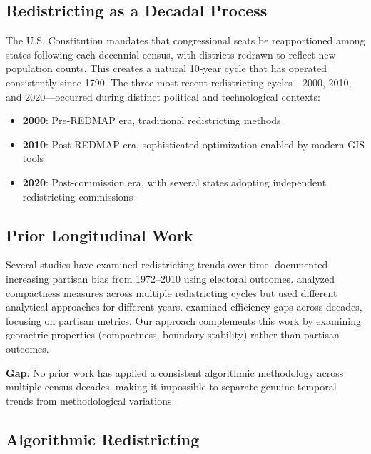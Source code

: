 
\subsection{Redistricting as a Decadal Process}

The U.S. Constitution mandates that congressional seats be reapportioned among states following each decennial census, with districts redrawn to reflect new population counts. This creates a natural 10-year cycle that has operated consistently since 1790. The three most recent redistricting cycles—2000, 2010, and 2020—occurred during distinct political and technological contexts:

\begin{itemize}
    \item \textbf{2000}: Pre-REDMAP era, traditional redistricting methods
    \item \textbf{2010}: Post-REDMAP era, sophisticated optimization enabled by modern GIS tools
    \item \textbf{2020}: Post-commission era, with several states adopting independent redistricting commissions
\end{itemize}

\subsection{Prior Longitudinal Work}

Several studies have examined redistricting trends over time. \citet{altman2011gerrymandering} documented increasing partisan bias from 1972--2010 using electoral outcomes. \citet{henderson2018measuring} analyzed compactness measures across multiple redistricting cycles but used different analytical approaches for different years. \citet{mcghee2014redistricting} examined efficiency gaps across decades, focusing on partisan metrics. Our approach complements this work by examining geometric properties (compactness, boundary stability) rather than partisan outcomes.

\textbf{Gap}: No prior work has applied a consistent algorithmic methodology across multiple census decades, making it impossible to separate genuine temporal trends from methodological variations.

\subsection{Algorithmic Redistricting}

